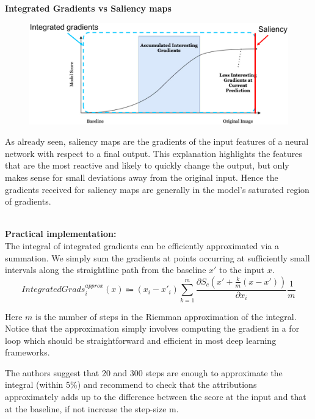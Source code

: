 \textbf{Integrated Gradients vs Saliency maps}\\
\begin{minipage}{0.55\textwidth}
    \begin{figure}[H]
        \includegraphics[width=\textwidth]{img/IGvsSM.png}
        \centering
    \end{figure}    
\end{minipage}
\hfill
\begin{minipage}{0.4\textwidth}
    As already seen, saliency maps are the gradients of the input features of a neural network with respect to
a final output. This explanation highlights the features that are the most reactive and likely to quickly
change the output, but only makes sense for small deviations away from the original input. Hence the
gradients received for saliency maps are generally in the model's saturated region of gradients.
\end{minipage}\\

\textbf{Practical implementation:}\\
The integral of integrated gradients can be efficiently approximated via a summation. We simply sum the gradients at points occurring at sufficiently small intervals along the straightline path from the baseline $x'$ to the input $x$.
\begin{equation*}
    IntegratedGrads_i^{approx}(x) \Coloneqq (x_i-x'_i)\sum_{k=1}^m \frac{\partial S_c(x'+\frac{k}{m}(x-x'))}{\partial x_i}\frac{1}{m}
\end{equation*}

Here $m$ is the number of steps in the Riemman approximation of the integral. Notice that the approximation simply involves computing the gradient in a for loop which should be straightforward and efficient in most deep learning frameworks.

The authors suggest that 20 and 300 steps are enough to approximate the integral (within 5\%) and recommend to check that the attributions approximately adds up to the difference between the score at
the input and that at the baseline, if not increase the step-size m.